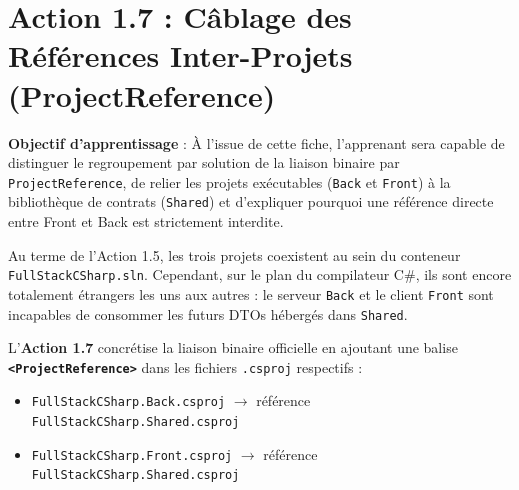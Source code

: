 \section{Action 1.7 : Câblage des Références Inter-Projets (ProjectReference)}

\begin{tcolorbox}[colback=indigo!4!white,colframe=indigo!40!white,arc=2mm,boxrule=0.8pt,top=2mm,bottom=2mm,left=3mm,right=3mm]
    \small\textbf{\color{indigo!90!black}Objectif d'apprentissage} : À l'issue de cette fiche, l'apprenant sera capable de distinguer le regroupement par solution de la liaison binaire par \texttt{ProjectReference}, de relier les projets exécutables (\texttt{Back} et \texttt{Front}) à la bibliothèque de contrats (\texttt{Shared}) et d'expliquer pourquoi une référence directe entre Front et Back est strictement interdite.
\end{tcolorbox}

\vspace{0.1cm}

Au terme de l'Action 1.5, les trois projets coexistent au sein du conteneur \texttt{FullStackCSharp.sln}. Cependant, sur le plan du compilateur C\#, ils sont encore totalement étrangers les uns aux autres : le serveur \texttt{Back} et le client \texttt{Front} sont incapables de consommer les futurs DTOs hébergés dans \texttt{Shared}.

L'\textbf{Action 1.7} concrétise la liaison binaire officielle en ajoutant une balise \textbf{\texttt{<ProjectReference>}} dans les fichiers \texttt{.csproj} respectifs :
\begin{itemize}
    \item \texttt{FullStackCSharp.Back.csproj} $\longrightarrow$ référence \texttt{FullStackCSharp.Shared.csproj}
    \item \texttt{FullStackCSharp.Front.csproj} $\longrightarrow$ référence \texttt{FullStackCSharp.Shared.csproj}
\end{itemize}

\vspace{0.3cm}

